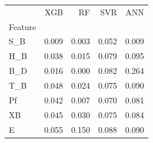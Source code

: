 \begin{tabular}{lrrrr}
\toprule
 & XGB & RF & SVR & ANN \\
Feature &  &  &  &  \\
\midrule
S\_B & 0.009 & 0.003 & 0.052 & 0.009 \\
H\_B & 0.038 & 0.015 & 0.079 & 0.095 \\
B\_D & 0.016 & 0.000 & 0.082 & 0.264 \\
T\_B & 0.048 & 0.024 & 0.075 & 0.090 \\
Pf & 0.042 & 0.007 & 0.070 & 0.081 \\
XB & 0.045 & 0.030 & 0.075 & 0.084 \\
E & 0.055 & 0.150 & 0.088 & 0.090 \\
\bottomrule
\end{tabular}
